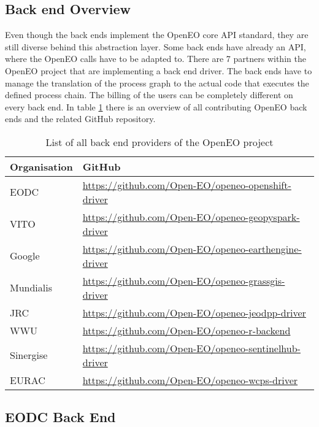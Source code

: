 \documentclass[draft,final]{vutinfth} %
\begin{document}
\subsection{Back end Overview}\label{Back end Overview}
Even though the back ends implement the OpenEO core API standard, they are still diverse behind this abstraction layer. Some back ends have already an API, where the OpenEO calls have to be adapted to. There are 7 partners within the OpenEO project that are implementing a back end driver. The back ends have to manage the translation of the process graph to the actual code that executes the defined process chain. The billing of the users can be completely different on every back end. In table \ref{Tab:backends} there is an overview of all contributing OpenEO back ends and the related GitHub repository. 
\begin{table}[]
	\caption{List of all back end providers of the OpenEO project}
	\begin{tabular}{l|l}
		\textbf{Organisation} & \textbf{GitHub}  \\ \hline
		EODC & \url{https://github.com/Open-EO/openeo-openshift-driver} \\ \hline 
		VITO & \url{https://github.com/Open-EO/openeo-geopyspark-driver} \\ \hline  
		Google  & \url{https://github.com/Open-EO/openeo-earthengine-driver} \\ \hline  
		Mundialis & \url{https://github.com/Open-EO/openeo-grassgis-driver} \\ \hline 
		JRC & \url{https://github.com/Open-EO/openeo-jeodpp-driver} \\ \hline
		WWU & \url{https://github.com/Open-EO/openeo-r-backend} \\ \hline
		Sinergise & \url{https://github.com/Open-EO/openeo-sentinelhub-driver} \\ \hline
		EURAC & \url{https://github.com/Open-EO/openeo-wcps-driver} \\ 
	\end{tabular}
\label{Tab:backends}
\end{table}

\subsection{EODC Back End}\label{EODC Back End}
 
\end{document}
